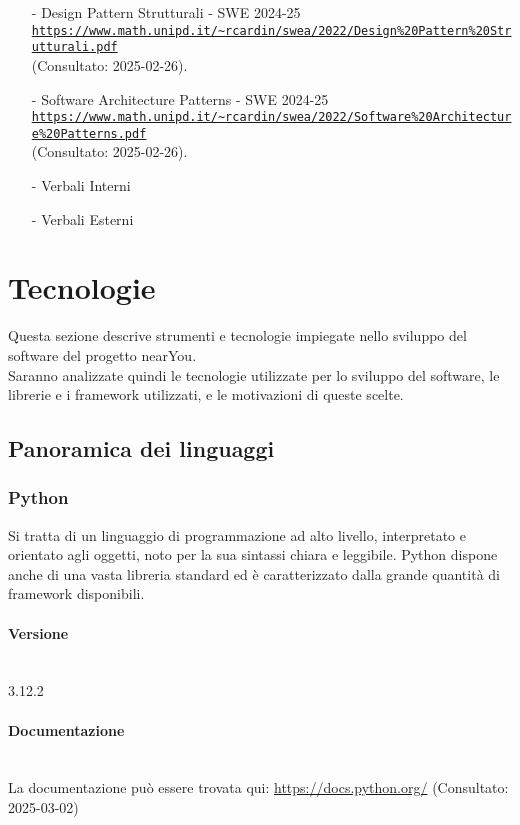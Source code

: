 \documentclass[10pt]{article}
\newcommand{\myparagraph}[1]{\paragraph{#1}\mbox{}\\\vspace{0.4em}}
\begin{document}
\begin{justify}
\begin{itemize}
    \item[-] Design Pattern Strutturali - SWE 2024-25\\
    \textcolor{blue}{\texttt{\url{https://www.math.unipd.it/\~rcardin/swea/2022/Design\%20Pattern\%20Strutturali.pdf}}}\\ (Consultato: 2025-02-26).
    
    \item[-] Software Architecture Patterns - SWE 2024-25\\
    \textcolor{blue}{\texttt{\url{https://www.math.unipd.it/\~rcardin/swea/2022/Software\%20Architecture\%20Patterns.pdf}}}\\ (Consultato: 2025-02-26).
    
    \item[-] Verbali Interni
    \item[-] Verbali Esterni
\end{itemize}

\section{Tecnologie}
Questa sezione descrive strumenti e tecnologie impiegate nello sviluppo del software del progetto nearYou.\\
Saranno analizzate quindi le tecnologie utilizzate per lo sviluppo del software, le librerie e i framework utilizzati, e le motivazioni di queste scelte.\\

\subsection{Panoramica dei linguaggi}
\label{sec:linguaggi}
    \subsubsection{Python}
        Si tratta di un linguaggio di programmazione ad alto livello, interpretato e orientato agli oggetti, noto per la sua sintassi chiara e leggibile. Python dispone
        anche di una vasta libreria standard ed è caratterizzato dalla grande quantità di framework disponibili.\\
        \myparagraph{Versione}
            3.12.2
        \myparagraph{Documentazione}
                 La documentazione può essere trovata qui: \textcolor{blue}{\url{https://docs.python.org/}} (Consultato: 2025-03-02)

\end{justify}
\end{document}
